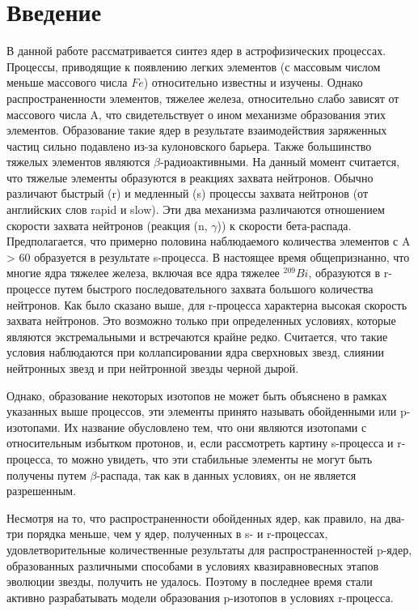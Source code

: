 \documentclass[14pt, a4paper]{article}
\begin{document}
\tableofcontents
\section*{\centering Введение}
В данной работе рассматривается синтез ядер в астрофизических процессах. Процессы, приводящие к появлению легких элементов (с массовым числом меньше массового числа $Fe$) относительно известны и изучены. Однако распространенности элементов, тяжелее железа, относительно слабо зависят от массового числа A, что свидетельствует о ином механизме образования этих элементов. Образование такие ядер в результате взаимодействия заряженных частиц сильно подавлено из-за кулоновского барьера. Также большинство тяжелых элементов являются $\beta$-радиоактивными. На данный момент считается, что тяжелые элементы образуются в реакциях захвата нейтронов. Обычно различают быстрый (r) и медленный (s) процессы захвата нейтронов (от английских слов rapid и slow). Эти два механизма различаются отношением скорости захвата нейтронов (реакция (n, $\gamma$)) к скорости бета-распада. Предполагается, что примерно половина наблюдаемого количества элементов с A > 60 образуется в результате s-процесса. В настоящее время общепризнанно, что многие ядра тяжелее железа, включая все ядра тяжелее $^{209}Bi$, образуются в   r-процессе путем быстрого последовательного захвата большого количества нейтронов. Как было сказано выше, для r-процесса характерна высокая скорость захвата нейтронов. Это возможно только при определенных условиях, которые являются экстремальными и встречаются крайне редко. Считается, что такие условия наблюдаются при коллапсировании ядра сверхновых звезд, слиянии нейтронных звезд и при нейтронной звезды черной дырой.

Однако, образование некоторых изотопов не может быть объяснено в рамках указанных выше процессов, эти элементы принято называть обойденными или p-изо\-то\-па\-ми. Их название обусловлено тем, что они являются изотопами с относительным избытком протонов, и, если рассмотреть картину s-процесса и r-процесса, то можно увидеть, что эти стабильные элементы не могут быть получены путем $\beta$-распада, так как в данных условиях, он не является разрешенным.

Несмотря на то, что распространенности обойденных ядер, как правило, на два-три порядка меньше, чем у ядер, полученных в s- и r-процессах, удовлетворительные количественные результаты для распространенностей p-ядер, образованных различными способами в условиях квазиравновесных этапов эволюции звезды, получить не удалось. Поэтому в последнее время стали активно разрабатывать модели образования p-изотопов в условиях r-процесса.
\end{document}
